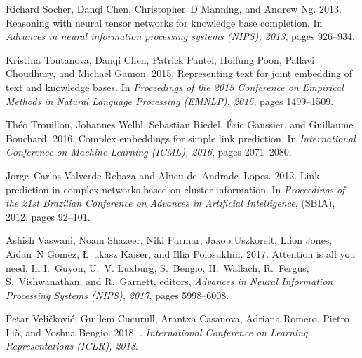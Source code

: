 \documentclass[11pt,a4paper]{article}
\begin{document}
\begin{thebibliography}{29}
Richard Socher, Danqi Chen, Christopher~D Manning, and Andrew Ng.
  2013{}.
\newblock Reasoning with neural tensor networks for knowledge base completion.
\newblock In \emph{Advances in neural information processing systems (NIPS),
  2013}, pages 926--934.

Kristina Toutanova, Danqi Chen, Patrick Pantel, Hoifung Poon, Pallavi
  Choudhury, and Michael Gamon. 2015.
\newblock Representing text for joint embedding of text and knowledge bases.
\newblock In \emph{Proceedings of the 2015 Conference on Empirical Methods in
  Natural Language Processing (EMNLP), 2015}, pages 1499--1509.

Th{\'e}o Trouillon, Johannes Welbl, Sebastian Riedel, {\'E}ric Gaussier, and
  Guillaume Bouchard. 2016.
\newblock Complex embeddings for simple link prediction.
\newblock In \emph{International Conference on Machine Learning (ICML), 2016},
  pages 2071--2080.

Jorge~Carlos Valverde-Rebaza and Alneu de~Andrade~Lopes. 2012.
\newblock Link prediction in complex networks based on cluster information.
\newblock In \emph{Proceedings of the 21st Brazilian Conference on Advances in
  Artificial Intelligence}, (SBIA), 2012, pages 92--101.

Ashish Vaswani, Noam Shazeer, Niki Parmar, Jakob Uszkoreit, Llion Jones,
  Aidan~N Gomez, \L~ukasz Kaiser, and Illia Polosukhin. 2017.
\newblock Attention is all you need.
\newblock In I.~Guyon, U.~V. Luxburg, S.~Bengio, H.~Wallach, R.~Fergus,
  S.~Vishwanathan, and R.~Garnett, editors, \emph{Advances in Neural
  Information Processing Systems (NIPS), 2017}, pages 5998--6008.

Petar Veli{\v{c}}kovi{\'{c}}, Guillem Cucurull, Arantxa Casanova, Adriana
  Romero, Pietro Li{\`{o}}, and Yoshua Bengio. 2018.
.
\newblock \emph{International Conference on Learning Representations (ICLR),
  2018}.


\end{thebibliography}
\end{document}
